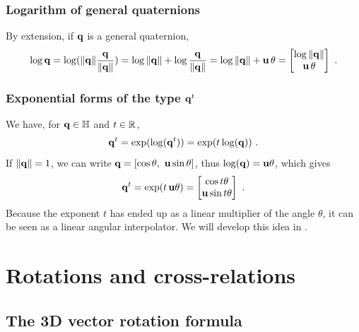 \subsubsection{Logarithm of general quaternions}

By extension, if ${\bf q}$ is a general quaternion,
%
\begin{align}
\log{\bf q} = \log({\left\|{\bf q}\right\|}\frac{{\bf q}}{{\left\|{\bf q}\right\|}}) = \log{\left\|{\bf q}\right\|} + \log\frac{{\bf q}}{{\left\|{\bf q}\right\|}} = \log{\left\|{\bf q}\right\|} + {\bf u}\,\theta = \begin{bmatrix}
\log{\left\|{\bf q}\right\|} \\ {\bf u}\,\theta
\end{bmatrix}
~.
\end{align}

\subsubsection{Exponential forms of the type ${\bf q}^t$}

We have, for ${\bf q}\in{\mathbb H}$ and $t\in{\mathbb R}$,
%
\begin{align}
{\bf q}^t = \exp(\log({\bf q}^t)) = \exp(t\log({\bf q}))
~.
\end{align}
%
If ${\left\|{\bf q}\right\|}=1$, we can write ${\bf q}=[\cos\theta,~{\bf u}\sin\theta]$, thus $\log({\bf q})={\bf u}\theta$, which gives
%
\begin{align}\label{equ:qa}
{\bf q}^t = \exp(t\,{\bf u}\theta)=\begin{bmatrix}
\cos t\theta \\
{\bf u}\sin t\theta
\end{bmatrix}
~.
\end{align}
%
Because the exponent $t$ has ended up as a linear multiplier of the angle $\theta$, it can be seen as a linear angular interpolator. We will develop this idea in .

\section{Rotations and cross-relations}
\label{sec:rotations}

\subsection{The 3D vector rotation formula}


